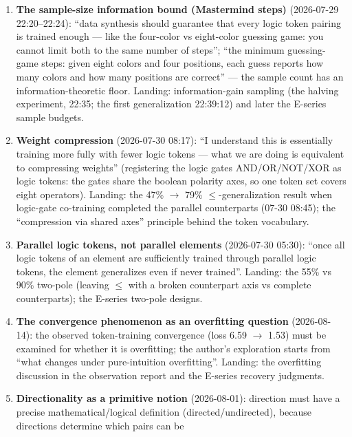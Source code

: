 \documentclass[sigplan,10pt,anonymous,review]{acmart}
\begin{document}
\begin{enumerate}
requirement was: if all elements at the input layer share the same token,
cancel that token; I never said cancel 0''). Cancellation is set
intersection --- pure compilation, no dimensional degeneration in high
dimensions. Landing: the cancellation/collapse mechanics of the v2--v5
training pipelines.
\item \textbf{The sample-size information bound (Mastermind steps)}
(2026-07-29 22:20--22:24): ``data synthesis should guarantee that every
logic token pairing is trained enough --- like the four-color vs
eight-color guessing game: you cannot limit both to the same number of
steps''; ``the minimum guessing-game steps: given eight colors and four
positions, each guess reports how many colors and how many positions are
correct'' --- the sample count has an information-theoretic floor.
Landing: information-gain sampling (the halving experiment, 22:35; the
first generalization 22:39:12) and later the E-series sample budgets.
\item \textbf{Weight compression} (2026-07-30 08:17): ``I understand this
is essentially training more fully with fewer logic tokens --- what we are
doing is equivalent to compressing weights'' (registering the logic gates
AND/OR/NOT/XOR as logic tokens: the gates share the boolean polarity
axes, so one token set covers eight operators). Landing: the 47\% $\to$
79\% $\le$-generalization result when logic-gate co-training completed the
parallel counterparts (07-30 08:45); the ``compression via shared axes''
principle behind the token vocabulary.
\item \textbf{Parallel logic tokens, not parallel elements}
(2026-07-30 05:30): ``once all logic tokens of an element are
sufficiently trained through parallel logic tokens, the element
generalizes even if never trained''. Landing: the 55\% vs 90\% two-pole
(leaving $\le$ with a broken counterpart axis vs complete counterparts);
the E-series two-pole designs.
\item \textbf{The convergence phenomenon as an overfitting question}
(2026-08-14): the observed token-training convergence (loss 6.59 $\to$
1.53) must be examined for whether it is overfitting; the author's
exploration starts from ``what changes under pure-intuition overfitting''.
Landing: the overfitting discussion in the observation report and the
E-series recovery judgments.
\item \textbf{Directionality as a primitive notion} (2026-08-01):
direction must have a precise mathematical/logical definition
(directed/undirected), because directions determine which pairs can be

\end{enumerate}
\end{document}
